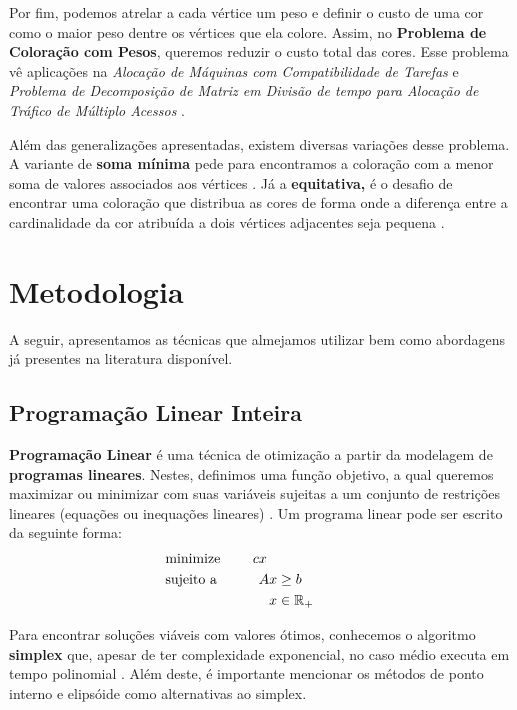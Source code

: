 \documentclass[11pt]{article}
\begin{document}
Por fim, podemos atrelar a cada vértice um peso e definir o custo de uma cor como o maior peso dentre os vértices que ela colore.
Assim, no \textbf{Problema de Coloração com Pesos}, queremos reduzir o custo total das cores.
Esse problema vê aplicações na \emph{Alocação de Máquinas com Compatibilidade de Tarefas} e \emph{Problema de Decomposição de Matriz em Divisão de tempo para Alocação de Tráfico de Múltiplo Acessos} \autocites{Werra1985introductiontimetabling}[][]{Escoffier2006WeightedColoringfurther}[][]{Finke2008Batchprocessinginterval}.

Além das generalizações apresentadas, existem diversas variações desse problema.
A variante de \textbf{soma mínima} pede para encontramos a coloração com a menor soma de valores associados aos vértices \autocite{Jin2016Algorithmsminimumsum}.
Já a \textbf{equitativa,} é o desafio de encontrar uma coloração que distribua as cores de forma onde a diferença entre a cardinalidade da cor atribuída a dois vértices adjacentes seja pequena \autocite{Meyer1973EquitableColoring}.

\section{Metodologia}
\label{sec:org31f081f}
\label{metodologia}
A seguir, apresentamos as técnicas que almejamos utilizar bem como abordagens já presentes na literatura disponível.

\subsection{Programação Linear Inteira}
\label{sec:org43027ee}
\textbf{Programação Linear} é uma técnica de otimização a partir da modelagem de \textbf{programas lineares}.
Nestes, definimos uma função objetivo, a qual queremos maximizar ou minimizar com suas variáveis sujeitas a um conjunto de restrições lineares (equações ou inequações lineares) \autocite{Chvatal1983LinearProgramming} . Um programa linear pode ser escrito da seguinte forma:
\begin{alignat*}{4}
& \omit\rlap{minimize \quad \quad $\displaystyle cx$} \\
& \mbox{sujeito a}&& \quad & Ax & \geq b  & \quad &  \\
&                 &&       & x               & \in \mathbb{R}_+ &      &
\end{alignat*}

Para encontrar soluções viáveis com valores ótimos, conhecemos o algoritmo \textbf{simplex} que, apesar de ter complexidade exponencial, no caso médio executa em tempo polinomial \autocite{Borgwardt1986SimplexMethodAlgorithms}.
Além deste, é importante mencionar os métodos de ponto interno \autocite{Karmarkar1984newpolynomialtime} e elipsóide \autocite{Bland1981FeatureArticleTheEllipsoid} como alternativas ao simplex.
\end{document}
